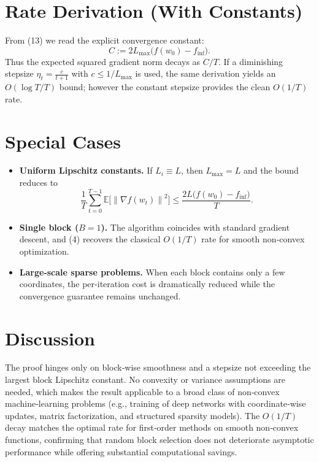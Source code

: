\documentclass{article}
\newcommand{\E}{\mathbb{E}}
\newcommand{\norm}[1]{\left\|#1\right\|}
\newcommand{\grad}{\nabla}
\begin{document}
\section*{Rate Derivation (With Constants)}
From (13) we read the explicit convergence constant:
\[
C:=2L_{\max}\bigl(f(w_0)-f_{\inf}\bigr).
\]
Thus the expected squared gradient norm decays as $C/T$.
If a diminishing stepsize $\eta_t=\frac{c}{t+1}$ with $c\le 1/L_{\max}$ is used,
the same derivation yields an $O(\log T/T)$ bound; however the constant stepsize
provides the clean $O(1/T)$ rate.

\section*{Special Cases}
\begin{itemize}
\item \textbf{Uniform Lipschitz constants.} If $L_i\equiv L$, then $L_{\max}=L$ and the bound reduces to
\[
\frac1T\sum_{t=0}^{T-1}\E\!\bigl[\norm{\grad f(w_t)}^{2}\bigr]\le
\frac{2L\bigl(f(w_0)-f_{\inf}\bigr)}{T}.
\]
\item \textbf{Single block ($B=1$).} The algorithm coincides with standard gradient descent,
and (4) recovers the classical $O(1/T)$ rate for smooth non‑convex optimization.
\item \textbf{Large‑scale sparse problems.} When each block contains only a few coordinates,
the per‑iteration cost is dramatically reduced while the convergence guarantee remains unchanged.
\end{itemize}

\section*{Discussion}
The proof hinges only on block‑wise smoothness and a stepsize not exceeding the
largest block Lipschitz constant.  No convexity or variance assumptions are needed,
which makes the result applicable to a broad class of non‑convex machine‑learning
problems (e.g., training of deep networks with coordinate‑wise updates, matrix factorization,
and structured sparsity models).  The $O(1/T)$ decay matches the optimal rate for
first‑order methods on smooth non‑convex functions, confirming that random block
selection does not deteriorate asymptotic performance while offering substantial
computational savings.
\end{document}
